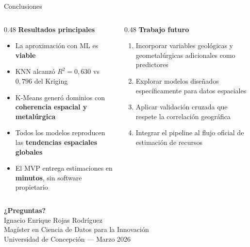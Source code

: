 \documentclass[10pt, aspectratio=169]{beamer}
\newcommand{\hl}[1]{\textcolor{accent}{\textbf{#1}}}
\newcommand{\emp}[1]{\textcolor{primary}{\textbf{#1}}}
\begin{document}
	\begin{frame}{Conclusiones}
		\begin{columns}[T]
			\begin{column}{0.48\textwidth}
				\textbf{Resultados principales}\\[6pt]
				\begin{itemize}
					\item La aproximación con ML es \hl{viable}
					\item KNN alcanzó $R^2 = 0{,}630$ vs $0{,}796$ del Kriging
					\item K-Means generó dominios con \emp{coherencia espacial y metalúrgica}
					\item Todos los modelos reproducen las \emp{tendencias espaciales globales}
					\item El MVP entrega estimaciones en \hl{minutos}, sin software propietario
				\end{itemize}
			\end{column}
			\begin{column}{0.48\textwidth}
				\textbf{Trabajo futuro}\\[6pt]
				\begin{enumerate}
					\item Incorporar variables geológicas y geometalúrgicas adicionales como predictores
					\item Explorar modelos diseñados específicamente para datos espaciales
					\item Aplicar validación cruzada que respete la correlación geográfica
					\item Integrar el pipeline al flujo oficial de estimación de recursos
				\end{enumerate}
			\end{column}
		\end{columns}
	\end{frame}
	
	\begin{frame}[standout]
		\Huge\textbf{¿Preguntas?}\\[12pt]
		\normalsize
		Ignacio Enrique Rojas Rodríguez\\[4pt]
		Magíster en Ciencia de Datos para la Innovación\\
		Universidad de Concepción — Marzo 2026
	\end{frame}
	
\end{document}
